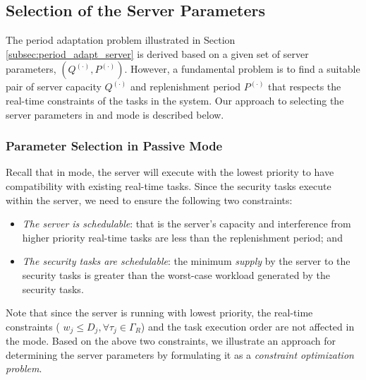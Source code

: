 \documentclass[../rt_server_main.tex]{subfiles}
\begin{document}
\subsection{Selection of the Server Parameters} \label{sec:server_param_selec}

The period adaptation problem illustrated in Section \ref{subsec:period_adapt_server}
  is derived based on a given set of server parameters, \eg $(Q^{(\cdot)}, P^{(\cdot)})$. However, a fundamental problem is to find a suitable pair of server capacity $Q^{(\cdot)}$ and replenishment period $P^{(\cdot)}$ that respects the real-time constraints of the tasks in the system. Our approach to selecting the server parameters in \pve and \ave mode is described below.

\subsubsection{Parameter Selection in Passive Mode} \label{subsec:param_pve}

Recall that in \pve mode, the server will execute with the lowest priority to have compatibility with existing real-time tasks. Since the security tasks execute within the server, we need to ensure the following two constraints:
\begin{itemize}

\item \textit{The server is schedulable}: that is  the server's capacity and interference from higher priority real-time tasks are less than the replenishment period; and

\item \textit{The security tasks are schedulable}: the minimum \textit{supply} by the server to the security tasks  is greater than the worst-case workload generated by the security tasks.

\end{itemize}

Note that since the server is running with lowest priority, the real-time constraints %
(\eg
$w_j \leq D_j, \forall \tau_j \in \Gamma_R$)
and the task execution order are not affected in the \pve mode.  Based on the above two constraints, we illustrate an approach for determining the server parameters by formulating it as a \textit{constraint optimization problem}.
\end{document}
